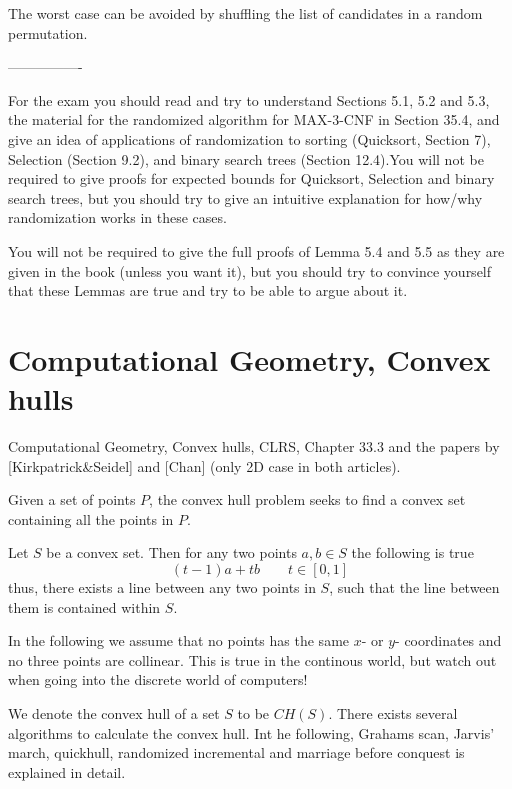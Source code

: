 \documentclass[10pt]{article}
\begin{document}
The worst case can be avoided by shuffling the list of candidates in a random permutation.


----------------

For the exam you should read and try to understand Sections 5.1, 5.2 and 5.3, the material for the randomized algorithm for MAX-3-CNF in Section 35.4, and give an idea of applications of randomization to sorting (Quicksort, Section 7), Selection (Section 9.2), and binary search trees (Section 12.4).You will not be required to give proofs for expected bounds for Quicksort, Selection and binary search trees, but you should try to give an intuitive explanation for how/why randomization works in these cases.

You will not be required to give the full proofs of Lemma 5.4 and 5.5 as they are given in the book (unless you want it), but you should try to convince yourself that these Lemmas are true and try to be able to argue about it. 




\section{Computational Geometry, Convex hulls} %
\label{sec:computational_geometry_convex_hulls}
Computational Geometry, Convex  hulls, CLRS,  Chapter 33.3 and the papers by [Kirkpatrick\&Seidel] and [Chan] (only 2D case in both articles).

Given a set of points $P$, the convex hull problem seeks to find a convex set containing all the points in $P$.

Let $S$ be a convex set. Then for any two points $a,b \in S$ the following is true
\begin{equation}
  (t-1)a+tb \qquad t \in [0,1]
\end{equation}
thus, there exists a line between any two points in $S$, such that the line between them is contained within $S$.

In the following we assume that no points has the same $x$- or $y$- coordinates and no three points are collinear. This is true in the continous world, but watch out when going into the discrete world of computers!

We denote the convex hull of a set $S$ to be $CH(S)$. There exists several algorithms to calculate the convex hull. Int he following, Grahams scan, Jarvis' march, quickhull, randomized incremental and marriage before conquest is explained in detail.
\end{document}
